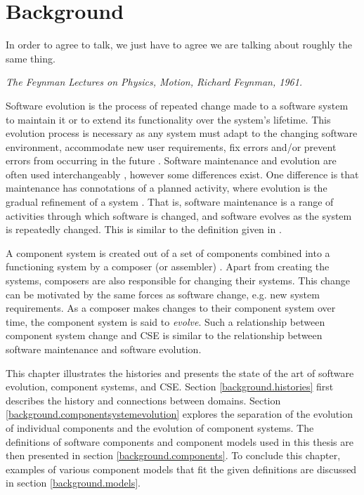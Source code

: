 \chapter{Background}
\label{background}
\epigraph{
In order to agree to talk, we just have to agree we are talking about roughly the same thing.
}
{\textit{The Feynman Lectures on Physics, Motion, Richard Feynman, 1961.}}

Software evolution \citep{lehman1980} is the process of repeated change made to a software system to maintain it or to extend its functionality over the system's lifetime.
This evolution process is necessary as any system must adapt to the changing software environment, accommodate new user requirements, 
fix errors and/or prevent errors from occurring in the future \citep{IsoIec2006}.
Software maintenance and evolution are often used interchangeably \citep{Godfrey2008}, however some differences exist.
One difference is that maintenance has connotations of a planned activity, where evolution is the gradual refinement of a system \citep{lehman1980}.
That is, software maintenance is a range of activities through which software is changed, and software evolves as the system is repeatedly changed.
This is similar to the definition given in \citep{lehman1980}.

A component system is created out of a set of components combined into a functioning system by a composer (or assembler) \citep{Szyperski2002}.
Apart from creating the systems, composers are also responsible for changing their systems.
This change can be motivated by the same forces as software change, e.g. new system requirements.   
As a composer makes changes to their component system over time, the component system is said to \textit{evolve}.
Such a relationship between component system change and CSE is similar to the relationship between software maintenance and software evolution.

This chapter illustrates the histories and presents the state of the art of software evolution, component systems, and CSE.
Section \ref{background.histories} first describes the history and connections between domains. 
Section \ref{background.componentsystemevolution} explores the separation of the evolution of individual components and the evolution of component systems.
The definitions of software components and component models used in this thesis are then presented in section \ref{background.components}.
To conclude this chapter, examples of various component models that fit the given definitions are discussed in section \ref{background.models}.

